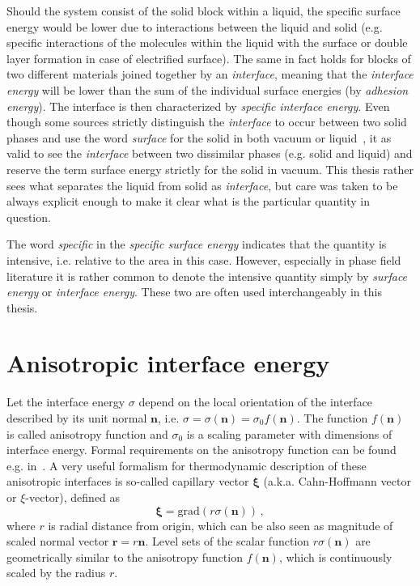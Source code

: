 Should the system consist of the solid block within a liquid, the specific surface energy would be lower due to interactions between the liquid and solid (e.g. specific interactions of the molecules within the liquid with the surface or double layer formation in case of electrified surface). The same in fact holds for blocks of two different materials joined together by an \textit{interface}, meaning that the \textit{interface energy} will be lower than the sum of the individual surface energies (by \textit{adhesion energy}). The interface is then characterized by \textit{specific interface energy}. Even though some sources strictly distinguish the \textit{interface} to occur between two solid phases and use the word \textit{surface} for the solid in both vacuum or liquid~\cite{Milchev2002}, it as valid to see the \textit{interface} between two dissimilar phases (e.g. solid and liquid) and reserve the term surface energy strictly for the solid in vacuum. This thesis rather sees what separates the liquid from solid as \textit{interface}, but care was taken to be always explicit enough to make it clear what is the particular quantity in question.

The word \textit{specific} in the \textit{specific surface energy} indicates that the quantity is intensive, i.e. relative to the area in this case. However, especially in phase field literature it is rather common to denote the intensive quantity simply by \textit{surface energy} or \textit{interface energy}. These two are often used interchangeably in this thesis.


\section{Anisotropic interface energy}
Let the interface energy $\sigma$ depend on the local orientation of the interface described by its unit normal $\bm{n}$, i.e. $\sigma=\sigma(\bm{n})=\sigma_0 f(\bm{n})$. The function $f(\bm{n})$ is called anisotropy function and $\sigma_0$  is a scaling parameter with dimensions of interface energy. Formal requirements on the anisotropy function can be found e.g. in~\cite{Kobayashi2001}. A very useful formalism for thermodynamic description of these anisotropic interfaces is so-called capillary vector $\bm{\xi}$ (a.k.a. Cahn-Hoffmann vector or $\xi$-vector), defined as~\cite{Hoffman1972,Cahn1974}
\begin{equation}
    \bm{\xi} = \mathrm{grad}(r\sigma(\bm{n}))\,,
\end{equation}
where $r$ is radial distance from origin, which can be also seen as magnitude of scaled normal vector $\bm{r}=r\bm{n}$. Level sets of the scalar function $r\sigma(\bm{n})$ are geometrically similar to the anisotropy function $f(\bm{n})$, which is continuously scaled by the radius $r$.

